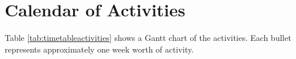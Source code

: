 \section{Calendar of Activities}


Table \ref{tab:timetableactivities} shows a Gantt chart of the activities.  Each bullet represents approximately
one week worth of activity.

%
%
\newcommand{\weekone}{\textbullet}
\newcommand{\weektwo}{\textbullet \textbullet}
\newcommand{\weekthree}{\textbullet \textbullet \textbullet}
\newcommand{\weekfour}{\textbullet \textbullet \textbullet \textbullet}

%
%

